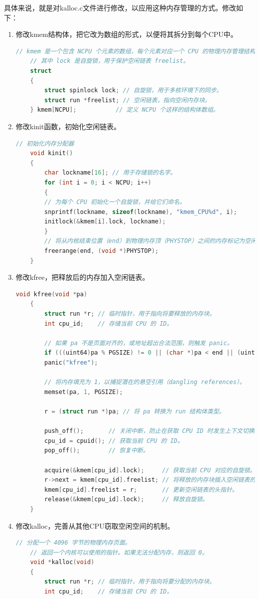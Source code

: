 具体来说，就是对kalloc.c文件进行修改，以应用这种内存管理的方式。修改如下：
\begin{enumerate}
    \item 修改kmem结构体，把它改为数组的形式，以便将其拆分到每个CPU中。
          \begin{lstlisting}[language=c,title=对kmem结构体的修改]
    // kmem 是一个包含 NCPU 个元素的数组，每个元素对应一个 CPU 的物理内存管理结构。
    // 其中 lock 是自旋锁，用于保护空闲链表 freelist。
    struct
    {
        struct spinlock lock; // 自旋锁，用于多核环境下的同步。
        struct run *freelist; // 空闲链表，指向空闲内存块。
    } kmem[NCPU];           // 定义 NCPU 个这样的结构体数组。
    \end{lstlisting}
    \item 修改kinit函数，初始化空闲链表。
          \begin{lstlisting}[language=c,title=对kinit函数的修改]
    // 初始化内存分配器
    void kinit()
    {
        char lockname[16]; // 用于存储锁的名字。
        for (int i = 0; i < NCPU; i++)
        {
        // 为每个 CPU 初始化一个自旋锁，并给它们命名。
        snprintf(lockname, sizeof(lockname), "kmem_CPU%d", i);
        initlock(&kmem[i].lock, lockname);
        }
        // 将从内核结束位置（end）到物理内存顶（PHYSTOP）之间的内存标记为空闲。
        freerange(end, (void *)PHYSTOP);
    }    
    \end{lstlisting}
    \item 修改kfree，把释放后的内存加入空闲链表。
          \begin{lstlisting}[language=c,title=对kfree函数的修改]
    void kfree(void *pa)
    {
        struct run *r; // 临时指针，用于指向将要释放的内存块。
        int cpu_id;    // 存储当前 CPU 的 ID。
    
        // 如果 pa 不是页面对齐的，或地址超出合法范围，则触发 panic。
        if (((uint64)pa % PGSIZE) != 0 || (char *)pa < end || (uint64)pa >= PHYSTOP)
        panic("kfree");
    
        // 将内存填充为 1，以捕捉潜在的悬空引用（dangling references）。
        memset(pa, 1, PGSIZE);
    
        r = (struct run *)pa; // 将 pa 转换为 run 结构体类型。
    
        push_off();       // 关闭中断，防止在获取 CPU ID 时发生上下文切换。
        cpu_id = cpuid(); // 获取当前 CPU 的 ID。
        pop_off();        // 恢复中断。
    
        acquire(&kmem[cpu_id].lock);     // 获取当前 CPU 对应的自旋锁。
        r->next = kmem[cpu_id].freelist; // 将释放的内存块插入空闲链表的头部。
        kmem[cpu_id].freelist = r;       // 更新空闲链表的头指针。
        release(&kmem[cpu_id].lock);     // 释放自旋锁。
    }    
    \end{lstlisting}
    \item 修改kalloc，完善从其他CPU窃取空闲空间的机制。
          \begin{lstlisting}[language=c,title=对kalloc函数的修改]
    // 分配一个 4096 字节的物理内存页面。
    // 返回一个内核可以使用的指针。如果无法分配内存，则返回 0。
    void *kalloc(void)
    {
        struct run *r; // 临时指针，用于指向将要分配的内存块。
        int cpu_id;    // 存储当前 CPU 的 ID。
    

\end{lstlisting}
\end{enumerate}
